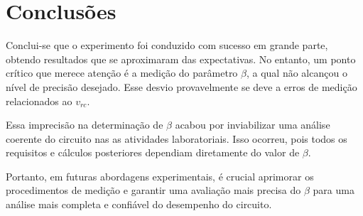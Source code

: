 \section{Conclusões}

Conclui-se que o experimento foi conduzido com sucesso em grande parte, obtendo resultados que se aproximaram das expectativas. No entanto, um ponto crítico que merece atenção é a medição do parâmetro $\beta$, a qual não alcançou o nível de precisão desejado. Esse desvio provavelmente se deve a erros de medição relacionados ao $v_{rc}$.

Essa imprecisão na determinação de $\beta$ acabou por inviabilizar uma análise coerente do circuito nas as atividades laboratoriais. Isso ocorreu, pois todos os requisitos e cálculos posteriores dependiam diretamente do valor de $\beta$.

Portanto, em futuras abordagens experimentais, é crucial aprimorar os procedimentos de medição e garantir uma avaliação mais precisa do $\beta$ para uma análise mais completa e confiável do desempenho do circuito.